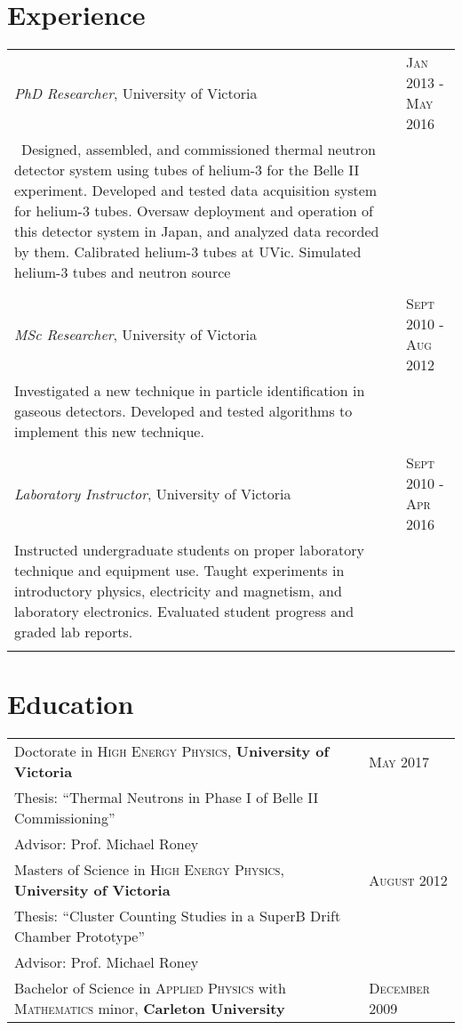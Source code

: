 \documentclass{article}
\begin{document}
\section{Experience}
\begin{tabular}{p{14cm}l}
 \textit{PhD Researcher}, University of Victoria & \textsc{Jan 2013 - May 2016} \\
	 \	 \footnotesize{Designed, assembled, and commissioned thermal neutron detector system using tubes of helium-3 for the Belle II experiment. Developed and tested data acquisition system for helium-3 tubes. Oversaw deployment and operation of this detector system in Japan, and analyzed data recorded by them. Calibrated helium-3 tubes at UVic. Simulated helium-3 tubes and neutron source}&\\
&\\

  \textit{MSc Researcher}, University of Victoria & \textsc{Sept 2010 - Aug 2012}\\
	 \footnotesize{Investigated a new technique in particle identification in gaseous detectors. Developed and tested algorithms to implement this new technique.}&\\
&\\

  \textit{Laboratory Instructor}, University of Victoria & \textsc{Sept 2010 - Apr 2016}\\
	 \footnotesize{Instructed undergraduate students on proper laboratory technique and equipment use. Taught experiments in introductory physics, electricity and magnetism, and laboratory electronics. Evaluated student progress and graded lab reports.}&\\
&\\



\end{tabular}


\section{Education}
\begin{tabular}{p{14cm}l}	
  Doctorate in \textsc{High Energy Physics}, \textbf{University of Victoria} & \textsc{May} 2017 \\
 Thesis: ``Thermal Neutrons in Phase I of Belle II Commissioning'' &\\
 \small Advisor: Prof. Michael Roney&\smallskip\\


 Masters of Science in \textsc{High Energy Physics}, \textbf{University of Victoria} & \textsc{August} 2012\\
 Thesis: ``Cluster Counting Studies in a SuperB Drift Chamber Prototype'' &\\
 \small Advisor: Prof. Michael Roney&\smallskip\\


 Bachelor of Science in \textsc{Applied Physics} with \textsc{Mathematics} minor, \normalsize\textbf{Carleton University} & \textsc{December} 2009\\

\end{tabular}
\end{document}
